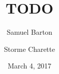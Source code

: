 \documentclass{article}
\title{TODO}
\date{March 4, 2017}
\author{Samuel Barton \and Storme Charette}
\begin{document}
    \maketitle

    \begin{FlushLeft}
        
        
        
        
        
        
        
    \end{FlushLeft}
\end{document}
